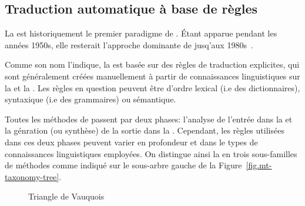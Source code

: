 \subsection{Traduction automatique à base de règles}
\label{sec.rbmt}

La  est historiquement le premier paradigme de . 
Étant apparue pendant les années 1950s, 
elle resterait l'approche dominante de  jusq'aux 1980s~\cite{routledge}.

Comme son nom l'indique, la  est basée sur des règles de traduction explicites,
qui sont généralement créées manuellement à partir de connaissances linguistiques sur la  et la . 
Les règles en question peuvent être d'ordre lexical (i.e des dictionnaires),
syntaxique (i.e des grammaires) ou sémantique.

Toutes les méthodes de  passent par deux phases: 
l'analyse de l'entrée dans la  
et la génration (ou synthèse) de la sortie dans la . 
Cependant, les règles utilisées dans ces deux phases peuvent varier en profondeur
et dans le types de connaissances linguistiques employées. 
On distingue ainsi la  en trois sous-familles de méthodes comme indiqué 
sur le sous-arbre gauche de la Figure~\ref{fig.mt-taxonomy-tree}.

\begin{figure}[h]
    \begin{center}
        
    \end{center}
    \caption{Triangle de Vauquois}
    \label{fig.vauquois-triangle}
\end{figure}


